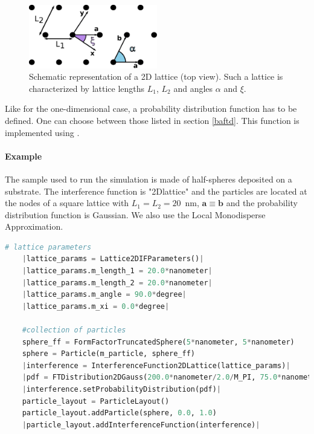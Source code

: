 \begin{figure}[h]
\begin{center}
\includegraphics[width=0.5\textwidth]{Figures/2Dlattice.eps}
\end{center}
\caption{Schematic representation of a 2D lattice (top view). Such a lattice is characterized by lattice lengths $L_1$, $L_2$ and angles $\alpha$ and $\xi$.}
\label{fig:2dlattice}
\end{figure}

Like for the one-dimensional case, a probability distribution function  has to be defined. One can choose between those listed in section \ref{baftd}. This function is implemented using .%

\paragraph{Example} The sample used to run the simulation is made of half-spheres deposited on a substrate. The interference function is "2Dlattice" and the particles are located at the nodes of a square lattice with $L_1=L_2=20$~nm, $\mathbf{a}\equiv \mathbf{b}$ and the probability distribution function is Gaussian. We also use the Local Monodisperse Approximation. 

\begin{lstlisting}[language=python, style=eclipseboxed,numbers=none,nolol,caption={\Code{Python} script to define a 2DLattice interference function between hemi-spherical particles as well as the Local Monodisperse Approximation in \Code{getSimulation()}.  The part specific to the interferences is marked in red italic font.},label={lst:2dlatticeinterf}]
    # lattice parameters
    |lattice_params = Lattice2DIFParameters()|
    |lattice_params.m_length_1 = 20.0*nanometer|
    |lattice_params.m_length_2 = 20.0*nanometer|
    |lattice_params.m_angle = 90.0*degree|
    |lattice_params.m_xi = 0.0*degree|

    #collection of particles
    sphere_ff = FormFactorTruncatedSphere(5*nanometer, 5*nanometer)
    sphere = Particle(m_particle, sphere_ff)
    |interference = InterferenceFunction2DLattice(lattice_params)|
    |pdf = FTDistribution2DGauss(200.0*nanometer/2.0/M_PI, 75.0*nanometer/2.0/M_PI)|
    |interference.setProbabilityDistribution(pdf)|
    particle_layout = ParticleLayout()
    particle_layout.addParticle(sphere, 0.0, 1.0)
    |particle_layout.addInterferenceFunction(interference)|
\end{lstlisting}
 
